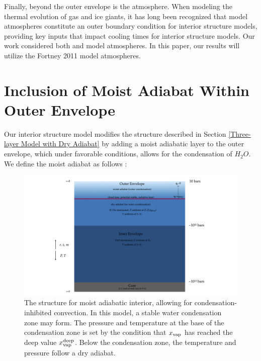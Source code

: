 \documentclass[11pt]{ucscthesisbs}
\begin{document}
Finally, beyond the outer envelope is the atmosphere. When modeling the thermal evolution of gas and ice giants, it has long been recognized that model atmospheres constitute an outer boundary condition for interior structure models, providing key inputs that impact cooling times for interior structure models. Our work considered both \citep{graboske_1975} and \citep{fortney_2011} model atmospheres. In this paper, our results will utilize the Fortney 2011 model atmospheres. 

\section{Inclusion of Moist Adiabat Within Outer Envelope}
Our interior structure model modifies the structure described in Section \ref{Three-layer Model with Dry Adiabat} by adding a moist adiabatic layer to the outer envelope, which under favorable conditions, allows for the condensation of $H_{2}O$. We define the moist adiabat as follows \citep{robinson_2016}:

\begin{figure}[ht!]
 \centerline{
  \includegraphics[width=8.0in]{figures/moist_adiabat_structure.png}
 }
\caption[Interior Structure for Moist Adiabat]
{The structure for moist adiabatic interior, allowing for condensation-inhibited convection. In this model, a stable water condensation zone may form. The pressure and temperature at the base of the condensation zone is set by the condition that $x_{\rm vap}$ has reached the deep value $x_{\rm vap}^{\rm deep}$. Below the condensation zone, the temperature and pressure follow a dry adiabat.}
\label{fig:moist_interior}
\end{figure}
\end{document}

